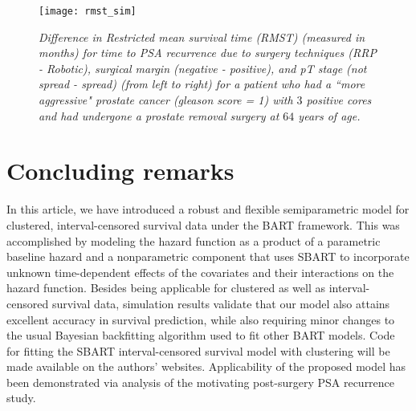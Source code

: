 \documentclass[11pt]{article}
\begin{document}
\begin{figure}[t]
	\centering
	\vspace{0.1in}
    \texttt{[image: rmst\_sim]}
	\caption{\textit{Difference in Restricted mean survival time (RMST) (measured in months) for time to PSA recurrence due to surgery techniques (RRP - Robotic), surgical margin (negative - positive), and pT stage (not spread - spread) (from left to right) for a patient who had a ``more aggressive" prostate cancer (gleason score = 1) with $3$ positive cores and had undergone a prostate removal surgery at $64$ years of age.} \label{fig:rmst}}	
\end{figure}



\section{Concluding remarks}
In this article, we have introduced a robust and flexible semiparametric model for clustered, interval-censored survival data under the BART framework. This was accomplished by modeling the hazard function as a product of a parametric baseline hazard and a nonparametric component that uses SBART to incorporate unknown 
time-dependent effects of the covariates and their interactions on the hazard function. Besides being applicable for clustered as well as interval-censored survival data, simulation results validate that our model also attains excellent accuracy in survival prediction, while also requiring minor changes to the usual Bayesian backfitting algorithm used to fit other BART models. Code for fitting the SBART interval-censored survival model with clustering will be made available on the authors' websites. Applicability of the proposed model has been demonstrated via analysis of the motivating post-surgery PSA recurrence study.
\end{document}

